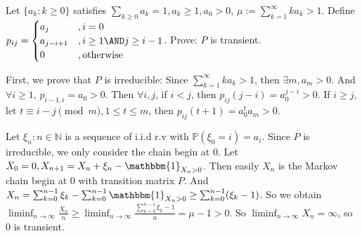 \documentclass{ctexart}
\begin{document}
\begin{problem}\label{pro:8}
  Let \(\{a_k:k \geq 0\}\) satisfies \(\sum_{k \geq 0}a_k =1, a_k \geq 1, a_0 >0\), \(\mu :=\sum_{k=1}^{\infty} ka_k >1\).
  Define \(p_{ij}=
  \begin{cases}
    a_j         & , i =0                    \\
    a_{j-i + 1} & ,i \geq 1 \AND j \geq i-1 \\
    0           & ,\text{otherwise}
  \end{cases}
  \).
  Prove: \(P\) is transient.
\end{problem}
\begin{solution}
  First, we prove that \(P\) is irreducible: Since \(\sum_{k=1}^{\infty} ka_k > 1\), then \(\exists m,a_m >0\).
  And \(\forall i \geq 1\), \( p_{i-1,i}=a_0 >0\). Then \(\forall i,j \), if \(i < j\), then \(p_{ij}(j-i)=a_0^{j-i}>0\).
  If \(i \geq j\), let \(t \equiv i-j \pmod{m}, 1 \leq t \leq m\), then \(p_{ij}(t + 1)=a_0^{t}a_m >0\).

  Let \(\xi_n :n \in \mathbb{N}\) is a sequence of i.i.d r.v with \(\mathbb{P}(\xi_0=i)=a_i\).
  Since \(P\) is irreducible, we only consider the chain begin at \(0\).
  Let \(X_0=0,X_{n+1}=X_n+\xi_n-\mathbbm{1}_{X_n>0}\).
  Then easily \(X_n\) is the Markov chain begin at \(0\) with transition matrix \(P\).
  And \(X_{n}=\sum_{k=0}^{n-1} \xi_k -\sum_{k=0}^{n-1} \mathbbm{1}_{X_n>0} \geq \sum_{k=0}^{n-1} (\xi_k-1)\).
  So we obtain \(\liminf_{n \to \infty}\frac{X_n}{n} \geq \liminf_{n \to \infty}\frac{\sum_{k=0}^{n-1} \xi_k-1}{n}=\mu-1>0\).
  So \(\liminf_{n \to \infty}X_n=\infty\), so \(0\) is transient.
\end{solution}
\end{document}
